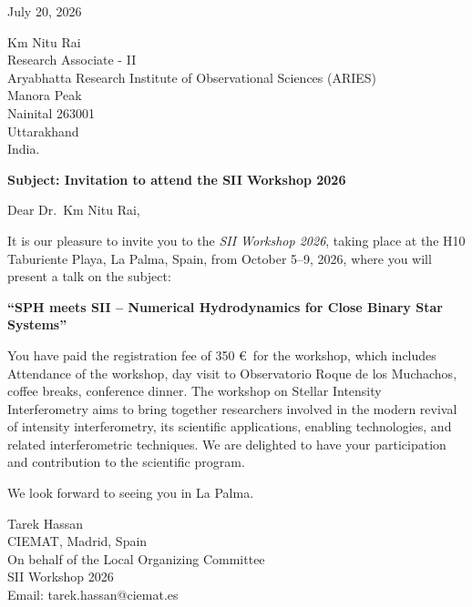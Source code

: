 \documentclass[11pt,a4paper]{letter}
\begin{document}
	
	\begin{flushright}
	 July 20, 2026
	\end{flushright}
	
	\vspace{1cm}
	
	\begin{flushleft}
		Km Nitu Rai\\
		Research Associate - II \\
		Aryabhatta Research Institute of Observational Sciences (ARIES)\\
		Manora Peak\\
		Nainital 263001\\
		Uttarakhand\\
		India.
	\end{flushleft}
	
	\vspace{1cm}
	
	\textbf{Subject: Invitation to attend the SII Workshop 2026}
	
	\vspace{0.8cm}
	
	Dear Dr.\ Km Nitu Rai,
	
	It is our pleasure to invite you to the \textit{SII Workshop 2026}, taking place at the H10 Taburiente Playa, La Palma, Spain, from October 5--9, 2026, where you will present a talk on the subject:
	
	\begin{center}
		\textbf{``SPH meets SII -- Numerical Hydrodynamics for Close Binary Star Systems''}
	\end{center}
	
	You have paid the registration fee of 350 \euro \, for the workshop, which includes Attendance of the workshop, day visit to Observatorio Roque de los Muchachos,	coffee breaks, conference dinner. The workshop on Stellar Intensity Interferometry aims to bring together researchers involved in the modern revival of intensity interferometry, its scientific applications, enabling technologies, and related interferometric techniques. We are delighted to have your participation and contribution to the scientific program.
	
	We look forward to seeing you in La Palma.
	
	\vspace{0.5cm}
	
	Tarek Hassan\\
	CIEMAT, Madrid, Spain\\
	On behalf of the Local Organizing Committee\\
	SII Workshop 2026\\
	Email: tarek.hassan@ciemat.es
	
\end{document}
